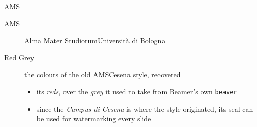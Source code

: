 \begin{frame}[c]{AMS}
%
\begin{description}
	\item[AMS] Alma Mater Studiorum\textendash{}Università di Bologna
	\item[Red Grey] the colours of the old \alert{AMSCesena} style, recovered
	\begin{itemize}
		\item its \textcolor{rgred}{\textit{reds}}, over the \textcolor{rggreymid}{\textit{grey}} it used to take from Beamer's own \texttt{beaver}
		\item since the \emph{Campus di Cesena} is where the style originated, its seal can be used for watermarking every slide
	\end{itemize}
\end{description}
%
\end{frame}
